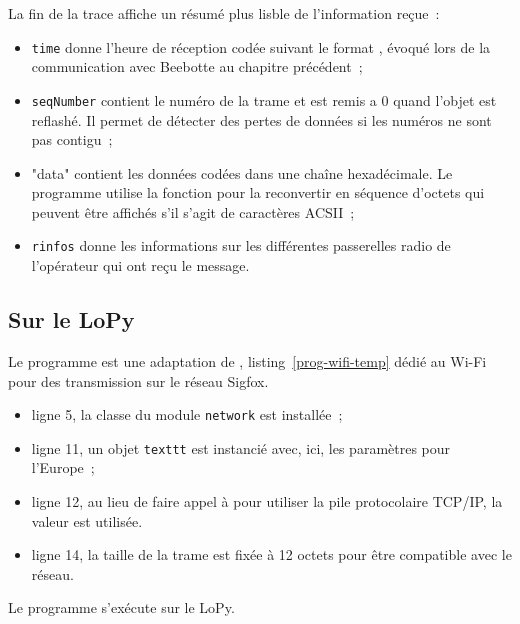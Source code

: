 La fin de la trace affiche un résumé plus lisble de l'information reçue~:

\begin{itemize}
    \item  \texttt{time} donne l’heure de réception codée suivant le format , évoqué lors de la communication avec Beebotte au chapitre précédent~;
    \item \texttt{seqNumber} contient le numéro de la trame et est remis a 0 quand l’objet est reflashé. Il permet de détecter des pertes de données si les numéros ne sont pas contigu~; 
    \item "data" contient les données codées dans une chaîne hexadécimale. Le programme utilise la fonction  pour la reconvertir en séquence d’octets qui peuvent être affichés s’il s’agit de caractères ACSII~;
    \item \texttt{rinfos} donne les informations sur les différentes passerelles radio de l’opérateur qui ont reçu le message.
\end{itemize}




\subsection{Sur le LoPy}

Le programme  est une adaptation de , listing~\vref{prog-wifi-temp} dédié au Wi-Fi pour des transmission sur le réseau Sigfox.


\begin{itemize}
    \item ligne 5, la classe  du module \texttt{network} est installée~;
    \item ligne 11, un objet \texttt{texttt} est instancié avec, ici, les paramètres pour l'Europe~;
    \item ligne 12, au lieu de faire appel à \texttt{} pour utiliser la pile protocolaire TCP/IP, la valeur \texttt{} est utilisée.
    \item ligne 14, la taille de la trame est fixée à 12 octets pour être compatible avec le réseau.
\end{itemize}

Le programme s'exécute sur le LoPy.

